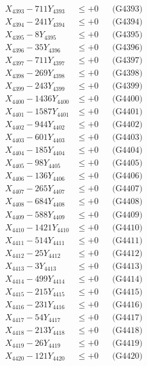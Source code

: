 \documentclass[a4paper,10pt]{article}
\begin{document}
{\begin{align}
X_{4393} - 711Y_{4393} &\leq +0 && \text{(G4393)} \\
X_{4394} - 241Y_{4394} &\leq +0 && \text{(G4394)} \\
X_{4395} - 8Y_{4395} &\leq +0 && \text{(G4395)} \\
X_{4396} - 35Y_{4396} &\leq +0 && \text{(G4396)} \\
X_{4397} - 711Y_{4397} &\leq +0 && \text{(G4397)} \\
X_{4398} - 269Y_{4398} &\leq +0 && \text{(G4398)} \\
X_{4399} - 243Y_{4399} &\leq +0 && \text{(G4399)} \\
X_{4400} - 1436Y_{4400} &\leq +0 && \text{(G4400)} \\
\allowbreak
X_{4401} - 1587Y_{4401} &\leq +0 && \text{(G4401)} \\
X_{4402} - 944Y_{4402} &\leq +0 && \text{(G4402)} \\
X_{4403} - 601Y_{4403} &\leq +0 && \text{(G4403)} \\
X_{4404} - 185Y_{4404} &\leq +0 && \text{(G4404)} \\
X_{4405} - 98Y_{4405} &\leq +0 && \text{(G4405)} \\
X_{4406} - 136Y_{4406} &\leq +0 && \text{(G4406)} \\
X_{4407} - 265Y_{4407} &\leq +0 && \text{(G4407)} \\
X_{4408} - 684Y_{4408} &\leq +0 && \text{(G4408)} \\
X_{4409} - 588Y_{4409} &\leq +0 && \text{(G4409)} \\
X_{4410} - 1421Y_{4410} &\leq +0 && \text{(G4410)} \\
\allowbreak
X_{4411} - 514Y_{4411} &\leq +0 && \text{(G4411)} \\
X_{4412} - 25Y_{4412} &\leq +0 && \text{(G4412)} \\
X_{4413} - 3Y_{4413} &\leq +0 && \text{(G4413)} \\
X_{4414} - 499Y_{4414} &\leq +0 && \text{(G4414)} \\
X_{4415} - 215Y_{4415} &\leq +0 && \text{(G4415)} \\
X_{4416} - 231Y_{4416} &\leq +0 && \text{(G4416)} \\
X_{4417} - 54Y_{4417} &\leq +0 && \text{(G4417)} \\
X_{4418} - 213Y_{4418} &\leq +0 && \text{(G4418)} \\
X_{4419} - 26Y_{4419} &\leq +0 && \text{(G4419)} \\
X_{4420} - 121Y_{4420} &\leq +0 && \text{(G4420)} \\

\end{align}}
\end{document}
